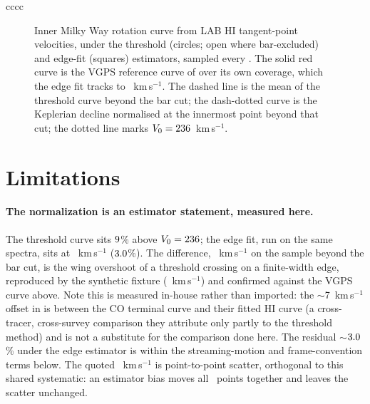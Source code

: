 \documentclass[twocolumn]{aastex631}
\begin{document}
\begin{deluxetable}{cccc}
\startdata

\enddata
\end{deluxetable}

\begin{figure}
\caption{Inner Milky Way rotation curve from LAB HI tangent-point velocities, under the threshold
(circles; open where bar-excluded) and edge-fit (squares) estimators, sampled every \hiStep\arcdeg.
The solid red curve is the VGPS reference curve of \citet{mccluregriffiths2016} over its own
coverage, which the edge fit tracks to \hiRealRefEdgeOffset~km\,s$^{-1}$. The dashed line is the
mean of the threshold curve beyond the bar cut; the dash-dotted curve is the Keplerian decline
normalised at the innermost point beyond that cut; the dotted line marks
$V_0=236$~km\,s$^{-1}$.}
\label{fig:rc}
\end{figure}

\section{Limitations}
\paragraph{The normalization is an estimator statement, measured here.} The threshold curve sits
$9$\% above $V_0=236$; the edge fit, run on the same spectra, sits at
\hiRealVflatEdge~km\,s$^{-1}$ ($3.0$\%). The difference,
\hiRealThrMinusEdge~km\,s$^{-1}$ on the sample beyond the bar cut, is the wing overshoot of a
threshold crossing on a finite-width edge, reproduced by the synthetic fixture
(\hiSynThrMinusEdge~km\,s$^{-1}$) and confirmed against the VGPS curve above. Note this is measured
in-house rather than imported: the $\sim$7~km\,s$^{-1}$ offset in \citet{mccluregriffiths2016} is
between the \citet{clemens1985} CO terminal curve and their fitted HI curve (a cross-tracer,
cross-survey comparison they attribute only partly to the threshold method) and is not a
substitute for the comparison done here. The residual $\sim$$3.0$\% under the edge
estimator is within the streaming-motion and frame-convention terms below. The quoted
\hiRealVflatScatter~km\,s$^{-1}$ is point-to-point scatter, orthogonal to this shared systematic:
an estimator bias moves all \hiRealNflat\ points together and leaves the scatter unchanged.
\end{document}
